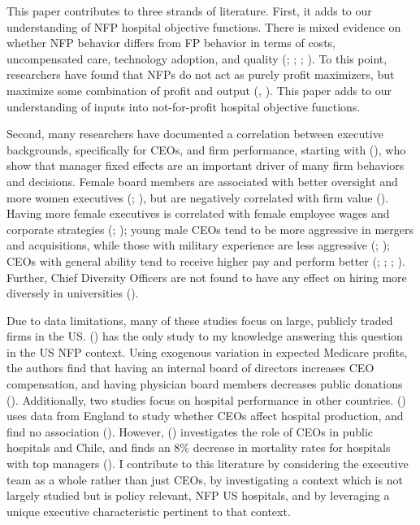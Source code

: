 \documentclass[12pt]{article}
\begin{document}
    This paper contributes to three strands of literature. First, it adds to our understanding of NFP hospital objective functions. There is mixed evidence on whether NFP behavior differs from FP behavior in terms of costs, uncompensated care, technology adoption, and quality (\cite{sloan2000not}; \cite{eggleston2008hospital}; \cite{moscelli2018effect}; \cite{moscone2020public}). To this point, researchers have found that NFPs do not act as purely profit maximizers, but maximize some combination of profit and output (\cite{deneffe2002not}, \cite{chang2011nonprofit}). This paper adds to our understanding of inputs into not-for-profit hospital objective functions. 

    Second, many researchers have documented a correlation between executive backgrounds, specifically for CEOs, and firm performance, starting with \citeauthor{bertrand2003managing} (\citeyear{bertrand2003managing}), who show that manager fixed effects are an important driver of many firm behaviors and decisions. Female board members are associated with better oversight and more women executives (\cite{matsa2011chipping}; \cite{adams2009women}), but are negatively correlated with firm value (\cite{ahern2012changing}). Having more female executives is correlated with female employee wages and corporate strategies (\cite{flabbi2019female}; \cite{matsa2013female}); young male CEOs tend to be more aggressive in mergers and acquisitions, while those with military experience are less aggressive (\cite{levi2010deal}; \cite{benmelech2015military}); CEOs with general ability tend to receive higher pay and perform better (\cite{kaplan2012ceo}; \cite{custodio2013generalists}; \cite{adams2018director}; \cite{frydman2019rising}). Further, Chief Diversity Officers are not found to have any effect on hiring more diversely in universities (\cite{bradley2022impact}). 
    
    Due to data limitations, many of these studies focus on large, publicly traded firms in the US. \citeauthor{brickley2010board} (\citeyear{brickley2010board}) has the only study to my knowledge answering this question in the US NFP context. Using exogenous variation in expected Medicare profits, the authors find that having an internal board of directors increases CEO compensation, and having physician board members decreases public donations (\cite{brickley2010board}). Additionally, two studies focus on hospital performance in other countries. \citeauthor{janke2019impact} (\citeyear{janke2019impact}) uses data from England to study whether CEOs affect hospital production, and find no association (\cite{janke2019impact}). However, \citeauthor{otero2022managers} (\citeyear{otero2022managers}) investigates the role of CEOs in public hospitals and Chile, and finds an 8\% decrease in mortality rates for hospitals with top managers (\cite{otero2022managers}). I contribute to this literature by considering the executive team as a whole rather than just CEOs, by investigating a context which is not largely studied but is policy relevant, NFP US hospitals, and by leveraging a unique executive characteristic pertinent to that context. 
\end{document}
